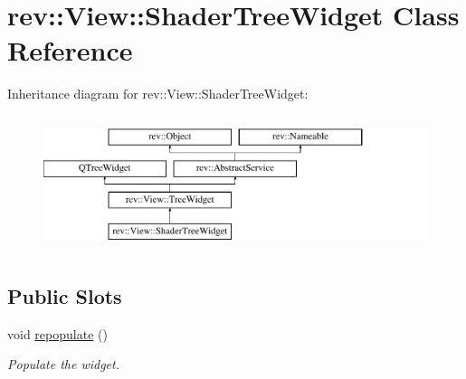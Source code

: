 \hypertarget{classrev_1_1_view_1_1_shader_tree_widget}{}\section{rev\+::View\+::Shader\+Tree\+Widget Class Reference}
\label{classrev_1_1_view_1_1_shader_tree_widget}
Inheritance diagram for rev\+::View\+::Shader\+Tree\+Widget\+:\begin{figure}[H]
\begin{center}
\leavevmode
\includegraphics[height=4.000000cm]{classrev_1_1_view_1_1_shader_tree_widget}
\end{center}
\end{figure}
\subsection*{Public Slots}
\begin{DoxyCompactItemize}
\item 
\mbox{\label{classrev_1_1_view_1_1_shader_tree_widget_a985d5d4ce8b45d59506c9bb3ff02692d}} 
void \mbox{\hyperlink{classrev_1_1_view_1_1_shader_tree_widget_a985d5d4ce8b45d59506c9bb3ff02692d}{repopulate}} ()
\begin{DoxyCompactList}\small\item\em Populate the widget. \end{DoxyCompactList}\end{DoxyCompactItemize}
